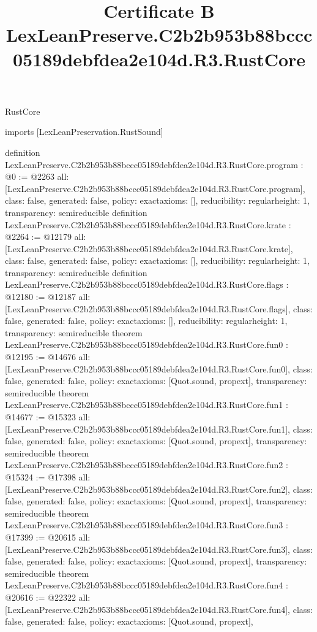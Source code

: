 \begin{lexlean}{RustCore}
\title{Certificate B LexLeanPreserve.C2b2b953b88bccc05189debfdea2e104d.R3.RustCore}
\begin{coremodule}
imports [LexLeanPreservation.RustSound]

definition LexLeanPreserve.C2b2b953b88bccc05189debfdea2e104d.R3.RustCore.program : @0 := @2263 {
  all: [LexLeanPreserve.C2b2b953b88bccc05189debfdea2e104d.R3.RustCore.program],
  class: false,
  generated: false,
  policy: exact{axioms: []},
  reducibility: regular{height: 1},
  transparency: semireducible
}
definition LexLeanPreserve.C2b2b953b88bccc05189debfdea2e104d.R3.RustCore.krate : @2264 := @12179 {
  all: [LexLeanPreserve.C2b2b953b88bccc05189debfdea2e104d.R3.RustCore.krate],
  class: false,
  generated: false,
  policy: exact{axioms: []},
  reducibility: regular{height: 1},
  transparency: semireducible
}
definition LexLeanPreserve.C2b2b953b88bccc05189debfdea2e104d.R3.RustCore.flags : @12180 := @12187 {
  all: [LexLeanPreserve.C2b2b953b88bccc05189debfdea2e104d.R3.RustCore.flags],
  class: false,
  generated: false,
  policy: exact{axioms: []},
  reducibility: regular{height: 1},
  transparency: semireducible
}
theorem LexLeanPreserve.C2b2b953b88bccc05189debfdea2e104d.R3.RustCore.fun0 : @12195 := @14676 {
  all: [LexLeanPreserve.C2b2b953b88bccc05189debfdea2e104d.R3.RustCore.fun0],
  class: false,
  generated: false,
  policy: exact{axioms: [Quot.sound, propext]},
  transparency: semireducible
}
theorem LexLeanPreserve.C2b2b953b88bccc05189debfdea2e104d.R3.RustCore.fun1 : @14677 := @15323 {
  all: [LexLeanPreserve.C2b2b953b88bccc05189debfdea2e104d.R3.RustCore.fun1],
  class: false,
  generated: false,
  policy: exact{axioms: [Quot.sound, propext]},
  transparency: semireducible
}
theorem LexLeanPreserve.C2b2b953b88bccc05189debfdea2e104d.R3.RustCore.fun2 : @15324 := @17398 {
  all: [LexLeanPreserve.C2b2b953b88bccc05189debfdea2e104d.R3.RustCore.fun2],
  class: false,
  generated: false,
  policy: exact{axioms: [Quot.sound, propext]},
  transparency: semireducible
}
theorem LexLeanPreserve.C2b2b953b88bccc05189debfdea2e104d.R3.RustCore.fun3 : @17399 := @20615 {
  all: [LexLeanPreserve.C2b2b953b88bccc05189debfdea2e104d.R3.RustCore.fun3],
  class: false,
  generated: false,
  policy: exact{axioms: [Quot.sound, propext]},
  transparency: semireducible
}
theorem LexLeanPreserve.C2b2b953b88bccc05189debfdea2e104d.R3.RustCore.fun4 : @20616 := @22322 {
  all: [LexLeanPreserve.C2b2b953b88bccc05189debfdea2e104d.R3.RustCore.fun4],
  class: false,
  generated: false,
  policy: exact{axioms: [Quot.sound, propext]},
}
\end{coremodule}
\end{lexlean}
